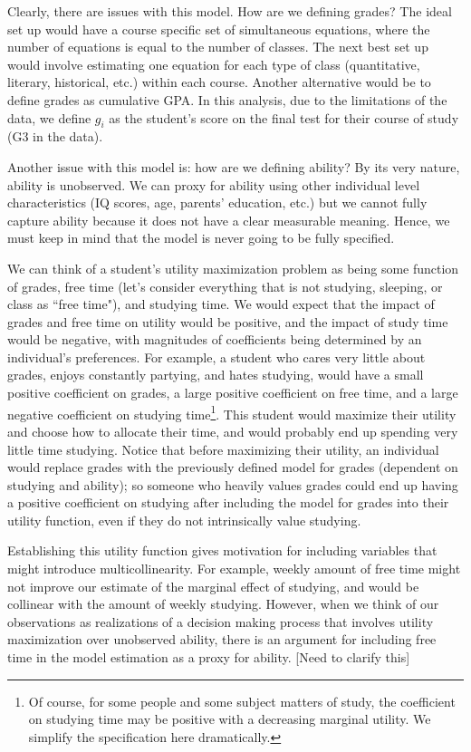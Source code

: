 \documentclass[12pt]{article}
\begin{document}
Clearly, there are issues with this model. How are we defining grades? The ideal set up would have a course specific set of simultaneous equations, where the number of equations is equal to the number of classes. The next best set up would involve estimating one equation for each type of class (quantitative, literary, historical, etc.) within each course. Another alternative would be to define grades as cumulative GPA. In this analysis, due to the limitations of the data, we define $g_i$ as the student's score on the final test for their course of study (G3 in the data).

Another issue with this model is: how are we defining ability? By its very nature, ability is unobserved. We can proxy for ability using other individual level characteristics (IQ scores, age, parents' education, etc.) but we cannot fully capture ability because it does not have a clear measurable meaning. Hence, we must keep in mind that the model is never going to be fully specified.

We can think of a student's utility maximization problem as being some function of grades, free time (let's consider everything that is not studying, sleeping, or class as ``free time"), and studying time. We would expect that the impact of grades and free time on utility would be positive, and the impact of study time would be negative, with magnitudes of coefficients being determined by an individual's preferences. For example, a student who cares very little about grades, enjoys constantly partying, and hates studying, would have a small positive coefficient on grades, a large positive coefficient on free time, and a large negative coefficient on studying time\footnote{Of course, for some people and some subject matters of study, the coefficient on studying time may be positive with a decreasing marginal utility. We simplify the specification here dramatically.}. This student would maximize their utility and choose how to allocate their time, and would probably end up spending very little time studying. Notice that before maximizing their utility, an individual would replace grades with the previously defined model for grades (dependent on studying and ability); so someone who heavily values grades could end up having a positive coefficient on studying after including the model for grades into their utility function, even if they do not intrinsically value studying.

Establishing this utility function gives motivation for including variables that might introduce multicollinearity. For example, weekly amount of free time might not improve our estimate of the marginal effect of studying, and would be collinear with the amount of weekly studying. However, when we think of our observations as realizations of a decision making process that involves utility maximization over unobserved ability, there is an argument for including free time in the model estimation as a proxy for ability. \textcolor{BlueGreen}{[Need to clarify this]}
\end{document}
